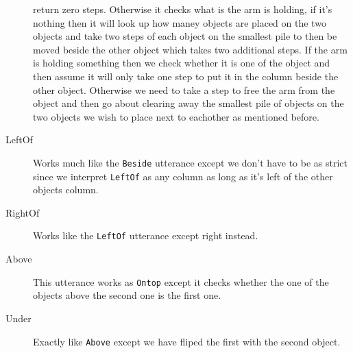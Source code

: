 \begin{description}
    return zero steps. Otherwise it checks what is the arm is holding, if it's
    nothing then it will look up how maney objects are placed on the two objects
    and take two steps of each object on the smallest pile to then be moved
    beside the other object which takes two additional steps. If the arm is
    holding something then we check whether it is one of the object and then
    assume it will only take one step to put it in the column beside the other
    object. Otherwise we need to take a step to free the arm from the object and
    then go about clearing away the smallest pile of objects on the two objects
    we wish to place next to eachother as mentioned before.
  \item[LeftOf] Works much like the \verb|Beside| utterance except we don't have
    to be as strict since we interpret \verb|LeftOf| as any column as long as
    it's left of the other objects column.
  \item[RightOf] Works like the \verb|LeftOf| utterance except right instead.
  \item[Above] This utterance works as \verb|Ontop| except it checks whether the
    one of the objects above the second one is the first one.
  \item[Under] Exactly like \verb|Above| except we have fliped the first with
    the second object.
\end{description}


